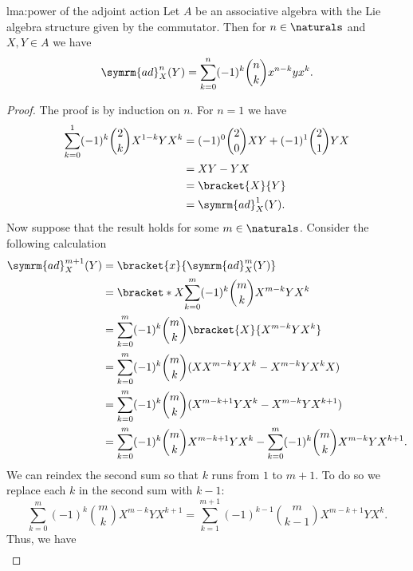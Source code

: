 \documentclass[fleqn]{NotesClass}
\newcommand{\ad}{\symrm{ad}}
\begin{document}
    \begin{lma}{}{lma:power of the adjoint action}
        Let \(A\) be an associative algebra with the Lie algebra structure given by the commutator.
        Then for \(n \in \naturals\) and \(X, Y \in A\) we have
        \begin{equation}
            \ad_X^n(Y) = \sum_{k=0}^n (-1)^k \binom{n}{k} x^{n-k}yx^k.
        \end{equation}
        \begin{proof}
            The proof is by induction on \(n\).
            For \(n = 1\) we have
            \begin{align}
                \sum_{k=0}^1 (-1)^{k} \binom{2}{k} X^{1 - k}YX^k &= (-1)^0 \binom{2}{0}XY + (-1)^1 \binom{2}{1}YX\\
                &= XY - YX\\
                &= \bracket{X}{Y}\\
                &= \ad_X^1(Y).
            \end{align}
            Now suppose that the result holds for some \(m \in \naturals\).
            Consider the following calculation
            \begin{align}
                \ad_X^{m + 1}(Y) &= \bracket{x}{\ad_X^m(Y)}\\
                &= \bracket*{X}{\sum_{k=0}^m (-1)^k \binom{m}{k} X^{m-k}YX^k}\\
                &= \sum_{k=0}^m (-1)^k \binom{m}{k} \bracket{X}{X^{m-k}YX^k}\\
                &= \sum_{k=0}^m (-1)^k \binom{m}{k} (XX^{m-k}YX^k - X^{m-k}YX^kX)\\
                &= \sum_{k=0}^m (-1)^k \binom{m}{k} (X^{m-k+1}YX^k - X^{m-k}YX^{k+1})\\
                &= \sum_{k=0}^m (-1)^k \binom{m}{k} X^{m-k+1}YX^k - \sum_{k=0}^m (-1)^k \binom{m}{k} X^{m-k}YX^{k+1}. \notag
            \end{align}
            We can reindex the second sum so that \(k\) runs from \(1\) to \(m + 1\).
            To do so we replace each \(k\) in the second sum with \(k - 1\):
            \begin{equation}
                \sum_{k=0}^m (-1)^k \binom{m}{k} X^{m-k}YX^{k+1} = \sum_{k=1}^{m+1} (-1)^{k-1} \binom{m}{k-1} X^{m-k+1}YX^k. 
            \end{equation}
            Thus, we have
            \begingroup
            \allowdisplaybreaks
            \begin{align}

\end{align}
\end{proof}
\end{lma}
\end{document}
